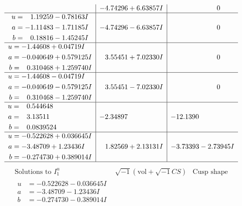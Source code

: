 \documentclass[1p]{elsarticle_modified}
\theoremstyle{definition}
\newcommand{\I}{\sqrt{-1}}
\begin{document}
$$\begin{array}{c|c|c}
 & -4.74296 + 6.63857 I & \phantom{-0.000000 } 0 \\ \hline\begin{aligned}
u &= \phantom{-}1.19259 - 0.78163 I \\
a &= -1.11483 - 1.71185 I \\
b &= \phantom{-}0.18816 - 1.45245 I\end{aligned}
 & -4.74296 - 6.63857 I & \phantom{-0.000000 } 0 \\ \hline\begin{aligned}
u &= -1.44608 + 0.04719 I \\
a &= -0.040649 + 0.579125 I \\
b &= \phantom{-}0.310468 + 1.259740 I\end{aligned}
 & \phantom{-}3.55451 + 7.02330 I & \phantom{-0.000000 } 0 \\ \hline\begin{aligned}
u &= -1.44608 - 0.04719 I \\
a &= -0.040649 - 0.579125 I \\
b &= \phantom{-}0.310468 - 1.259740 I\end{aligned}
 & \phantom{-}3.55451 - 7.02330 I & \phantom{-0.000000 } 0 \\ \hline\begin{aligned}
u &= \phantom{-}0.544648\phantom{ +0.000000I} \\
a &= \phantom{-}3.13511\phantom{ +0.000000I} \\
b &= \phantom{-}0.0839524\phantom{ +0.000000I}\end{aligned}
 & -2.34897\phantom{ +0.000000I} & -12.1390\phantom{ +0.000000I} \\ \hline\begin{aligned}
u &= -0.522628 + 0.036645 I \\
a &= -3.48709 + 1.23436 I \\
b &= -0.274730 + 0.389014 I\end{aligned}
 & \phantom{-}1.82569 + 2.13131 I & -3.73393 - 2.73945 I\\
 \hline 
 \end{array}$$\newpage$$\begin{array}{c|c|c}  
\text{Solutions to }I^u_{1}& \I (\text{vol} + \sqrt{-1}CS) & \text{Cusp shape}\\
 \hline 
\begin{aligned}
u &= -0.522628 - 0.036645 I \\
a &= -3.48709 - 1.23436 I \\
b &= -0.274730 - 0.389014 I\end{aligned}

\end{array}$$
\end{document}
